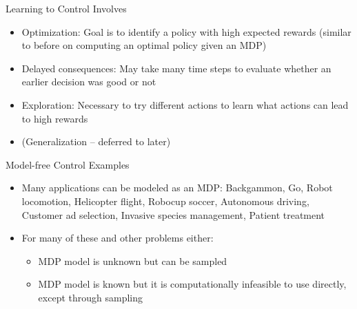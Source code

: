 \begin{frame}[c]{Learning to Control Involves}
	
	\begin{itemize}
		\item Optimization: Goal is to identify a policy with high expected rewards (similar to before on computing an optimal policy \alert{given} an MDP)
		\item Delayed consequences: May take many time steps to evaluate whether an earlier decision was good or not
		\item Exploration: Necessary to try different actions to learn what actions can lead to high rewards
		\item (Generalization -- deferred to later)
	\end{itemize}
	
\end{frame}
\begin{frame}[c]{Model-free Control Examples}
	
	\begin{itemize}
		\item Many applications can be modeled as an MDP: Backgammon, Go, Robot locomotion, Helicopter flight, Robocup soccer, Autonomous driving, Customer ad selection, Invasive species management, Patient
		treatment
		\item For many of these and other problems either:
		\begin{itemize}
			\item MDP model is unknown but can be sampled
			\item MDP model is known but it is computationally infeasible to use directly, except through sampling
		\end{itemize}
	\end{itemize}
	
\end{frame}
